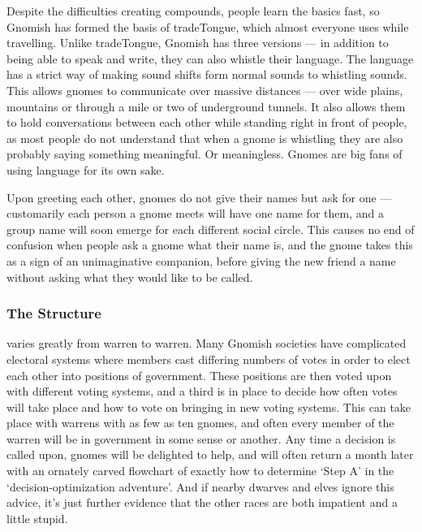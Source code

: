 Despite the difficulties creating compounds, people learn the basics fast, so Gnomish has formed the basis of \gls{tradeTongue}, which almost everyone uses while travelling.
Unlike \gls{tradeTongue}, Gnomish has three versions --- in addition to being able to speak and write, they can also whistle their language.
The language has a strict way of making sound shifts form normal sounds to whistling sounds.
This allows gnomes to communicate over massive distances --- over wide plains, mountains or through a mile or two of underground tunnels.
It also allows them to hold conversations between each other while standing right in front of people, as most people do not understand that when a gnome is whistling they are also probably saying something meaningful.
Or meaningless.
Gnomes are big fans of using language for its own sake. 

Upon greeting each other, gnomes do not give their names but ask for one --- customarily each person a gnome meets will have one name for them, and a group name will soon emerge for each different social circle. This causes no end of confusion when people ask a gnome what their name is, and the gnome takes this as a sign of an unimaginative companion, before giving the new friend a name without asking what they would like to be called.

\subsubsection{The Structure}
varies greatly from warren to warren.
Many Gnomish societies have complicated electoral systems where members cast differing numbers of votes in order to elect each other into positions of government.
These positions are then voted upon with different voting systems, and a third is in place to decide how often votes will take place and how to vote on bringing in new voting systems.
This can take place with warrens with as few as ten gnomes, and often every member of the warren will be in government in some sense or another.
Any time a decision is called upon, gnomes will be delighted to help, and will often return a month later with an ornately carved flowchart of exactly how to determine `Step A' in the `decision-optimization adventure'.
And if nearby dwarves and elves ignore this advice, it's just further evidence that the other races are both impatient and a little stupid.

